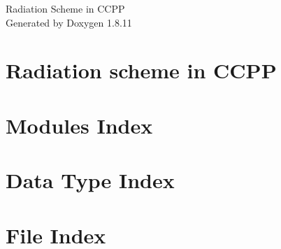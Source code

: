 \documentclass[twoside]{book}
\newcommand{\+}{\discretionary{\mbox{\scriptsize$\hookleftarrow$}}{}{}}
\newcommand{\clearemptydoublepage}{%
  \newpage{\pagestyle{empty}\cleardoublepage}%
}
\begin{document}
\hypersetup{pageanchor=false,
             bookmarksnumbered=true,
             pdfencoding=unicode
            }
\begin{titlepage}
\vspace*{7cm}
\begin{center}%
{\Large Radiation Scheme in C\+C\+PP }\\
\vspace*{1cm}
{\large Generated by Doxygen 1.8.11}\\
\end{center}
\end{titlepage}
\clearemptydoublepage
\tableofcontents
\clearemptydoublepage
{}
\hypersetup{pageanchor=true}

\chapter{Radiation scheme in C\+C\+PP}
\label{index}\hypertarget{index}{}
\chapter{Modules Index}

\chapter{Data Type Index}

\chapter{File Index}

\end{document}
